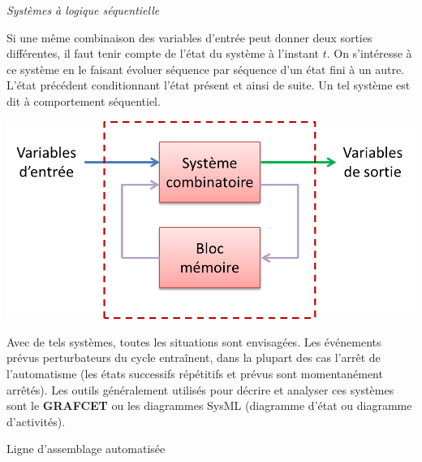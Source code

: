 \documentclass[11pt,oneside]{article}
\begin{document}
\begin{minipage}[c]{0.55\linewidth}
\begin{defi}
 \textit{\textsf{Systèmes à logique séquentielle}}

Si une même combinaison des variables d'entrée peut donner deux sorties
différentes, il faut tenir compte de l'état du système à l'instant $t$. On
s'intéresse à ce système en le faisant évoluer séquence par séquence d'un état
fini à un autre. L'état précédent conditionnant l'état présent et ainsi de
suite. Un tel système est dit à comportement séquentiel. 

\end{defi} 
\end{minipage} \hfill
\begin{minipage}[c]{0.4\linewidth}
 \begin{center}
    \includegraphics[width=\textwidth]{png/seq}
  \end{center}
\end{minipage}

Avec de tels systèmes, toutes les situations sont envisagées. Les événements
prévus perturbateurs du cycle entraînent, dans la plupart des cas l'arrêt de
l'automatisme (les états successifs répétitifs et prévus sont momentanément
arrêtés). Les outils généralement utilisés pour décrire et analyser ces
systèmes sont le \textbf{GRAFCET} ou les diagrammes SysML (diagramme d'état ou diagramme d'activités).

\begin{exemple}
 Ligne d'assemblage automatisée
\end{exemple}
\end{document}
